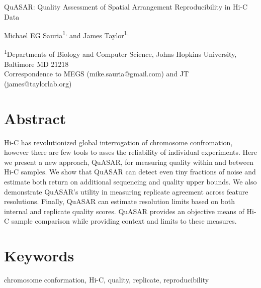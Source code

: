 \documentclass[letterpaper,11pt,english]{article}
\begin{document}
{\sffamily

{\fontsize{16pt}{16pt}\selectfont QuASAR: Quality Assessment of Spatial Arrangement Reproducibility in Hi-C Data}

\vspace{1em}

Michael EG Sauria\textsuperscript{1,\dagger} and James Taylor\textsuperscript{1,\dagger}

\vspace{0.5em}

\textsuperscript{1}Departments of Biology and Computer Science, Johns Hopkins University, Baltimore MD 21218 \\
\textsuperscript{\dagger}Correspondence to MEGS (mike.sauria@gmail.com) and JT (james@taylorlab.org)

}

\section{Abstract}

Hi-C has revolutionized global interrogation of chromosome confromation, however there are few tools to asses the reliability of individual experiments. Here we present a new approach, QuASAR, for measuring quality within and between Hi-C samples. We show that QuASAR can detect even tiny fractions of noise and estimate both return on additional sequencing and quality upper bounds. We also demonstrate QuASAR’s utility in measuring replicate agreement across feature resolutions. Finally, QuASAR can estimate resolution limits based on both internal and replicate quality scores. QuASAR provides an objective means of Hi-C sample comparison while providing context and limits to these measures.

\section{Keywords}
chromosome conformation, Hi-C, quality, replicate, reproducibility %

\clearpage


\end{document}
